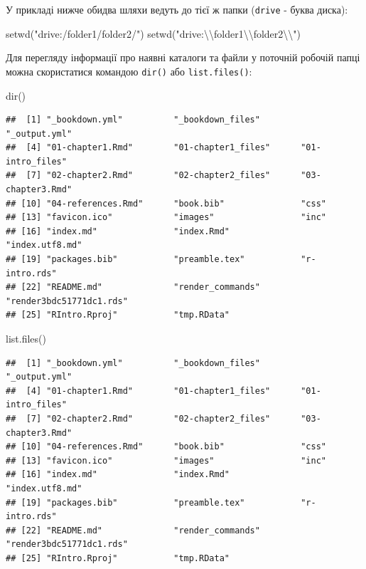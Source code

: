 \documentclass[
]{book}
\newenvironment{Shaded}{\begin{snugshade}}{\end{snugshade}}
\newcommand{\FunctionTok}[1]{\textcolor[rgb]{0.00,0.00,0.00}{#1}}
\newcommand{\NormalTok}[1]{#1}
\newcommand{\SpecialCharTok}[1]{\textcolor[rgb]{0.00,0.00,0.00}{#1}}
\newcommand{\StringTok}[1]{\textcolor[rgb]{0.31,0.60,0.02}{#1}}
\begin{document}
У прикладі нижче обидва шляхи ведуть до тієї ж папки (\texttt{drive} - буква диска):

\begin{Shaded}
\begin{Highlighting}[]
\FunctionTok{setwd}\NormalTok{(}\StringTok{"drive:/folder1/folder2/"}\NormalTok{)}
\FunctionTok{setwd}\NormalTok{(}\StringTok{"drive:}\SpecialCharTok{\textbackslash{}\textbackslash{}}\StringTok{folder1}\SpecialCharTok{\textbackslash{}\textbackslash{}}\StringTok{folder2}\SpecialCharTok{\textbackslash{}\textbackslash{}}\StringTok{"}\NormalTok{)}
\end{Highlighting}
\end{Shaded}

Для перегляду інформації про наявні каталоги та файли у поточній робочій папці можна скористатися командою \texttt{dir()} або \texttt{list.files()}:

\begin{Shaded}
\begin{Highlighting}[]
\FunctionTok{dir}\NormalTok{()}
\end{Highlighting}
\end{Shaded}

\begin{verbatim}
##  [1] "_bookdown.yml"          "_bookdown_files"        "_output.yml"           
##  [4] "01-chapter1.Rmd"        "01-chapter1_files"      "01-intro_files"        
##  [7] "02-chapter2.Rmd"        "02-chapter2_files"      "03-chapter3.Rmd"       
## [10] "04-references.Rmd"      "book.bib"               "css"                   
## [13] "favicon.ico"            "images"                 "inc"                   
## [16] "index.md"               "index.Rmd"              "index.utf8.md"         
## [19] "packages.bib"           "preamble.tex"           "r-intro.rds"           
## [22] "README.md"              "render_commands"        "render3bdc51771dc1.rds"
## [25] "RIntro.Rproj"           "tmp.RData"
\end{verbatim}

\begin{Shaded}
\begin{Highlighting}[]
\FunctionTok{list.files}\NormalTok{()}
\end{Highlighting}
\end{Shaded}

\begin{verbatim}
##  [1] "_bookdown.yml"          "_bookdown_files"        "_output.yml"           
##  [4] "01-chapter1.Rmd"        "01-chapter1_files"      "01-intro_files"        
##  [7] "02-chapter2.Rmd"        "02-chapter2_files"      "03-chapter3.Rmd"       
## [10] "04-references.Rmd"      "book.bib"               "css"                   
## [13] "favicon.ico"            "images"                 "inc"                   
## [16] "index.md"               "index.Rmd"              "index.utf8.md"         
## [19] "packages.bib"           "preamble.tex"           "r-intro.rds"           
## [22] "README.md"              "render_commands"        "render3bdc51771dc1.rds"
## [25] "RIntro.Rproj"           "tmp.RData"
\end{verbatim}
\end{document}
